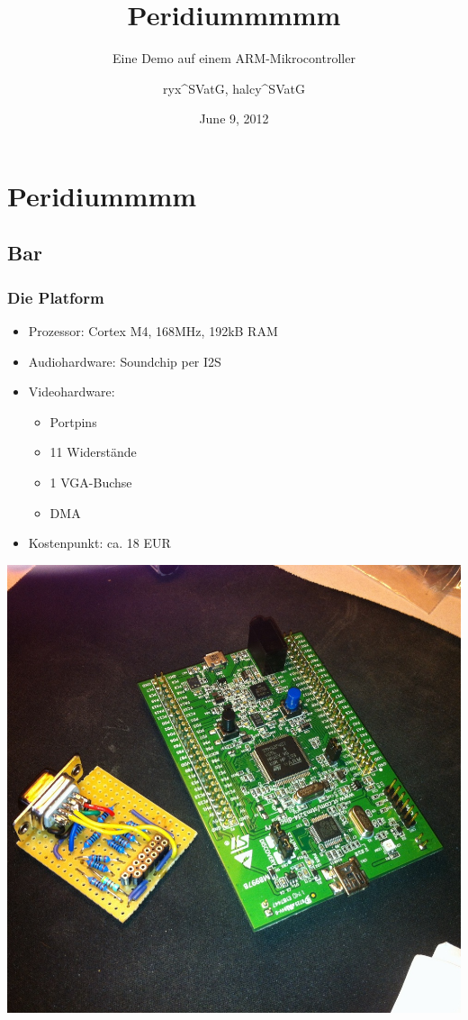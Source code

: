 \documentclass[t,14pt,aspectratio=169]{beamer}
\title{Peridiummmmm}
\subtitle{Eine Demo auf einem ARM-Mikrocontroller}
\author{ryx{\textasciicircum}SVatG, halcy{\textasciicircum}SVatG}
\begin{document}

\date{June 9, 2012}

\begin{frame} %
\titlepage
\end{frame}


\section{Peridiummmm}
\subsection{Bar}

\begin{frame} %
\frametitle{Die Platform}

\begin{minipage}{0.6\linewidth}
\begin{itemize}
\item Prozessor: Cortex M4, 168MHz, 192kB RAM
\item Audiohardware: Soundchip per I2S
\item Videohardware: 
\begin{itemize}
\item Portpins
\item 11 Widerstände
\item 1 VGA-Buchse
\item DMA
\end{itemize}
\item Kostenpunkt: ca. 18 EUR
\end{itemize}
\end{minipage}
\begin{minipage}{0.35\linewidth}
\includegraphics[width=\linewidth]{photos/cut}
\end{minipage}
\end{frame}
\end{document}
